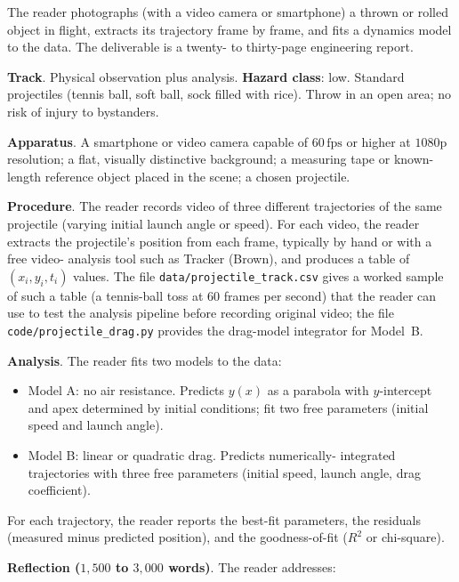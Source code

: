 \begin{project}
The reader photographs (with a video camera or smartphone) a thrown
or rolled object in flight, extracts its trajectory frame by frame,
and fits a dynamics model to the data. The deliverable is a
twenty- to thirty-page engineering report.

\textbf{Track}. Physical observation plus analysis.
\textbf{Hazard class}: low. Standard projectiles (tennis ball, soft
ball, sock filled with rice). Throw in an open area; no risk of
injury to bystanders.

\textbf{Apparatus}. A smartphone or video camera capable of
$60\,\text{fps}$ or higher at $1080\text{p}$ resolution; a flat,
visually distinctive background; a measuring tape or known-length
reference object placed in the scene; a chosen projectile.

\textbf{Procedure}. The reader records video of three different
trajectories of the same projectile (varying initial launch angle
or speed). For each video, the reader extracts the projectile's
position from each frame, typically by hand or with a free video-
analysis tool such as Tracker (Brown), and produces a table of
$(x_i, y_i, t_i)$ values. The file
\texttt{data/projectile\_track.csv} gives a worked sample of such a
table (a tennis-ball toss at $60$ frames per second) that the reader
can use to test the analysis pipeline before recording original
video; the file \texttt{code/projectile\_drag.py} provides the
drag-model integrator for Model~B.

\textbf{Analysis}. The reader fits two models to the data:

\begin{itemize}[leftmargin=*]
  \item Model A: no air resistance. Predicts $y(x)$ as a parabola
    with $y$-intercept and apex determined by initial conditions;
    fit two free parameters (initial speed and launch angle).
  \item Model B: linear or quadratic drag. Predicts numerically-
    integrated trajectories with three free parameters (initial
    speed, launch angle, drag coefficient).
\end{itemize}

For each trajectory, the reader reports the best-fit parameters,
the residuals (measured minus predicted position), and the
goodness-of-fit ($R^2$ or chi-square).

\textbf{Reflection ($1{,}500$ to $3{,}000$ words)}. The reader
addresses:


\end{project}

